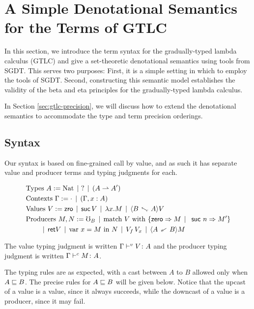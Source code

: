 \section{A Simple Denotational Semantics for the Terms of GTLC}\label{sec:gtlc-terms}

In this section, we introduce the term syntax for the gradually-typed
lambda calculus (GTLC) and give a set-theoretic denotational semantics
using tools from SGDT. This serves two purposes: First, it is a simple setting
in which to employ the tools of SGDT.
Second, constructing this semantic model establishes the validity of the
beta and eta principles for the gradually-typed lambda calculus.

In Section \ref{sec:gtlc-precision}, we will discuss how to extend the denotational
semantics to accommodate the type and term precision orderings.


\subsection{Syntax}\label{sec:term-syntax}

Our syntax is based on fine-grained call by value, and as such it has
separate value and producer terms and typing judgments for each.



\begin{align*}
  &\text{Types } A := \nat \alt \,\dyn \alt (A \ra A') \\
  &\text{Contexts } \Gamma := \cdot \alt (\Gamma, x : A) \\
  &\text{Values } V :=  \zro \alt \suc\, V \alt \lda{x}{M} \alt \up{A}{B} V \\ 
  &\text{Producers } M, N := \err_B \alt \matchnat {V} {M} {n} {M'} \\ 
  &\quad\quad \alt \ret {V} \alt \bind{x}{M}{N} \alt V_f\, V_x \alt \dn{A}{B} M 
\end{align*}


The value typing judgment is written ${\Gamma} \vdash^v {V} \colon {A}$ and 
the producer typing judgment is written ${\Gamma} \vdash^c {M} \colon {A}$.

The typing rules are as expected, with a cast between $A$ to $B$ allowed only when $A \sqsubseteq B$.
The precise rules for $A \sqsubseteq B$ will be given below.
Notice that the upcast of a value is a value, since it always succeeds, while the downcast
of a value is a producer, since it may fail.


